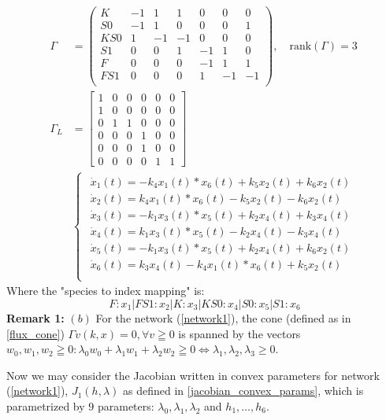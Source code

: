\begin{align*}
	\Gamma &=
	\begin{pmatrix}
		K & -1 &  1 &  1 &  0 &  0 &  0 \\
		S0& -1 &  1 &  0 &  0 &  0 &  1 \\
		KS0 &  1& -1& -1 &  0 &  0 &  0 \\
		S1 &  0 &  0 &  1& -1 &  1 &  0 \\
		F &  0 &  0 &  0& -1 &  1 &  1 \\
		FS1 &  0 &  0 &  0 &  1& -1& -1  \\		
	\end{pmatrix}, \quad \text{rank}(\Gamma) = 3 \\[3ex]
	\Gamma_L &=
	\begin{bmatrix}
		1&0&0&0&0&0\\
		1&0&0&0&0&0\\
		0&1&1&0&0&0\\
		0&0&0&1&0&0\\
		0&0&0&1&0&0\\
		0&0&0&0&1&1
	\end{bmatrix} \\[3ex]
	&
	\begin{cases*}
		\begin{array}{ll}
			\dot{x}_1(t) = -k_4 x_1(t) *x_6(t)+k_5 x_2(t)+k_6 x_2(t) \\
			\dot{x}_2(t) = k_4 x_1(t) *x_6(t)-k_5 x_2(t)-k_6 x_2(t) \\
			\dot{x}_3(t) = -k_1 x_3(t) *x_5(t)+k_2 x_4(t)+k_3 x_4(t) \\
			\dot{x}_4(t) = k_1 x_3(t) *x_5(t)-k_2 x_4(t)-k_3 x_4(t) \\
			\dot{x}_5(t) = -k_1 x_3(t) *x_5(t)+k_2 x_4(t)+k_6 x_2(t) \\
			\dot{x}_6(t) = k_3 x_4(t)-k_4 x_1(t) *x_6(t)+k_5 x_2(t) \\
		\end{array}	
	\end{cases*}
\end{align*}
Where the "species to index mapping" is:
\[
	F:  x_1
 | FS1: x_2
 | K: x_3
 | KS0: x_4
 | S0: x_5
 | S1: x_6
\]
\textbf{Remark 1:} $(b)$ For the network (\ref{network1}), the cone (defined as in \ref{flux_cone}) $\Gamma v(k,x) = 0, \forall v \geqq 0$ is spanned by the vectors $w_0, w_1, w_2 \geqq 0 : \lambda_0 w_0 + \lambda_1 w_1 + \lambda_2 w_2 \geqq 0 \iff \lambda_1, \lambda_2, \lambda_3 \geq 0$.

Now we may consider the Jacobian written in convex parameters for network (\ref{network1}), $J_1(h,\lambda)$ as defined in \ref{jacobian_convex_params}, which is parametrized by $9$ parameters: $\lambda_0, \lambda_1, \lambda_2$ and $h_1, \ldots, h_6$.

